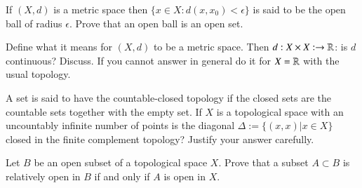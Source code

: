 \documentclass[12pt]{exam}
\theoremstyle{definition}
\newcommand{\R}{\mathcal{R}}
\def\R{{ \Bbb R}}
\begin{document}
\begin{questions}

\question

If $(X,d)$ is a metric space then $\{x\in X: d(x,x_0) < \epsilon \}$ is said to be the open ball of radius
$\epsilon$. Prove that an open ball is an open set.

\question

Define what it means for $(X,d)$ to be a metric space. Then $d:X \times X:\rightarrow \R$: is $d$ continuous?
Discuss. If you cannot answer in general do it for $X=\R$ with the usual  topology. %

\question


A set is said to have the countable-closed topology if the closed sets are the countable sets together with the
empty set. If $X$ is a topological space with an uncountably infinite number of points is the diagonal $\Delta:=
\{(x,x) | x \in X\}$ closed in the finite complement topology? Justify your answer carefully.

\question

Let $B$ be an open subset of a topological space $X$. Prove that a subset $A \subset B$ is relatively open in $B$
if and only if $A$ is open in $X$.




\end{questions}
\end{document}
